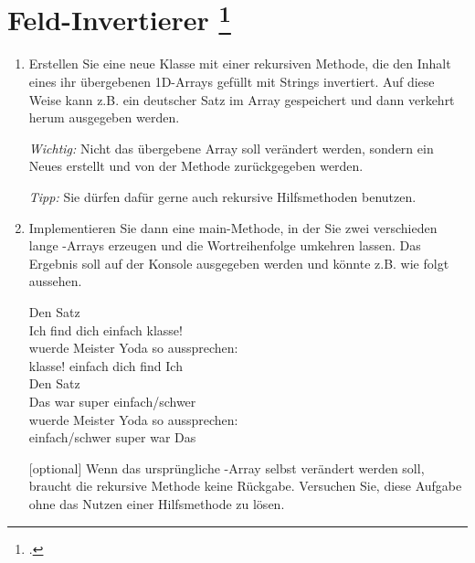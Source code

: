 \documentclass{lehramt-informatik-aufgabe}
\begin{document}

\section{Feld-Invertierer
\footcite[Aufgabe 1: Arrays und Rekursion, Diese Aufgabe stammt
aus der Vorlesung Konzepte der Programmierung von Prof. Bernhard
Westfechtel der Universität Bayreuth, WS 2017/18, Übungsblatt 8 und
wurde dankenswerterweise zur Verwendung in diesem Aufgabenblatt zur
Verfügung gestellt.]{aud:ab:2}}

\begin{enumerate}

%

\item Erstellen Sie eine neue Klasse  mit einer
rekursiven Methode, die den Inhalt eines ihr übergebenen 1D-Arrays
gefüllt mit Strings invertiert. Auf diese Weise kann z.B. ein deutscher
Satz im Array gespeichert und dann verkehrt herum ausgegeben werden.

\emph{Wichtig:} Nicht das übergebene Array soll verändert werden,
sondern ein Neues erstellt und von der Methode zurückgegeben werden.

\emph{Tipp:} Sie dürfen dafür gerne auch rekursive Hilfsmethoden
benutzen.

%

\item Implementieren Sie dann eine main-Methode, in der Sie zwei
verschieden lange -Arrays erzeugen und die Wortreihenfolge
umkehren lassen. Das Ergebnis soll auf der Konsole ausgegeben werden
und könnte z.B. wie folgt aussehen.

\bigskip

{
\ttfamily
Den Satz\\
Ich find dich einfach klasse!\\
wuerde Meister Yoda so aussprechen:\\
klasse! einfach dich find Ich\\

Den Satz\\
Das war super einfach/schwer\\
wuerde Meister Yoda so aussprechen:\\
einfach/schwer super war Das
}

\bigskip

[optional] Wenn das ursprüngliche -Array selbst verändert
werden soll, braucht die rekursive Methode keine Rückgabe. Versuchen
Sie, diese Aufgabe ohne das Nutzen einer Hilfsmethode zu lösen.

\begin{liAntwort}
\end{liAntwort}
\end{enumerate}
\end{document}
